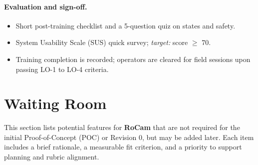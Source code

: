\documentclass[12pt]{article}
\begin{document}
\paragraph{Evaluation and sign-off.}
\begin{itemize}
  \item Short post-training checklist and a 5-question quiz on states and safety.
  \item System Usability Scale (SUS) quick survey; \emph{target:} score $\geq$ 70.
  \item Training completion is recorded; operators are cleared for field sessions upon passing LO-1 to LO-4 criteria.
\end{itemize}





\section{Waiting Room}
\label{sec:waiting-room}

This section lists potential features for \textbf{RoCam} that are not required for the initial Proof-of-Concept (POC) or Revision 0, but may be added later. Each item includes a brief rationale, a measurable fit criterion, and a priority to support planning and rubric alignment.
\end{document}
